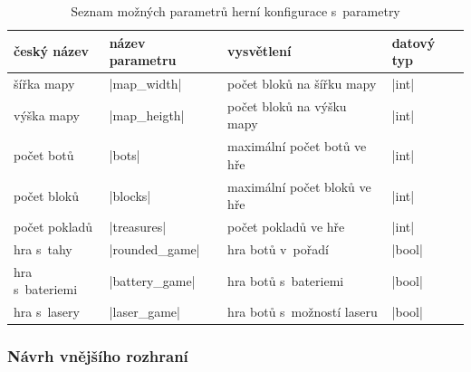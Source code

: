 \begin{table}[H]
	\caption{Seznam možných parametrů herní konfigurace s~parametry}
	\label{table:conf-parameters}
	\centering
	\vspace*{-5pt}
	\begin{tabular}{ l | l | l | l }
		český název & název parametru & vysvětlení & datový typ \\
		\hline
		šířka mapy & \ic|map_width| & počet bloků na šířku mapy & \ic|int| \\
		výška mapy & \ic|map_heigth| & počet bloků na výšku mapy & \ic|int| \\
		počet botů & \ic|bots| & maximální počet botů ve hře & \ic|int| \\
		počet bloků & \ic|blocks| & maximální počet bloků ve hře & \ic|int| \\
		počet pokladů & \ic|treasures| & počet pokladů ve hře & \ic|int| \\
		hra s~tahy & \ic|rounded_game| & hra botů v~pořadí & \ic|bool| \\
		hra s~bateriemi & \ic|battery_game| & hra botů s~bateriemi & \ic|bool| \\
		hra s~lasery & \ic|laser_game| & hra botů s~možností laseru & \ic|bool| \\
	\end{tabular}
	\vspace*{-15pt}
\end{table}

{\titlespacing*{\subsubsection}{0pt}{0.5ex}{0.5ex}
\subsubsection{Návrh vnějšího rozhraní}}

